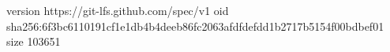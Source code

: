 version https://git-lfs.github.com/spec/v1
oid sha256:6f3bc6110191cf1e1db4b4deeb86fc2063afdfdefdd1b2717b5154f00bdbef01
size 103651
